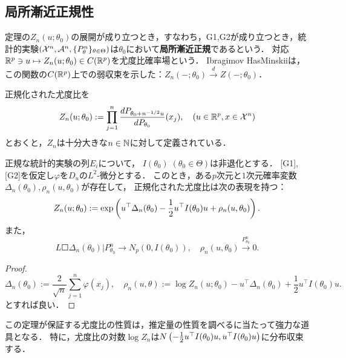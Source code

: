 \documentclass[uplatex,dvipdfmx]{jsreport}
\begin{document}
\subsection{局所漸近正規性}

\begin{tcolorbox}[colframe=ForestGreen, colback=ForestGreen!10!white,breakable,colbacktitle=ForestGreen!40!white,coltitle=black,fonttitle=\bfseries\sffamily,
title=]
    定理の$Z_n(u;\theta_0)$の展開が成り立つとき，すなわち，G1,G2が成り立つとき，統計的実験$(\mathcal{X}^n,\mathcal{A}^n,\{P^n_\theta\}_{\theta\in\Theta})$は$\theta_0$において\textbf{局所漸近正規}であるという．
    対応$\mathbb{R}^p\ni u\mapsto Z_n(u;\theta_0)\in C(\mathbb{R}^p)$を尤度比確率場という．
    Ibragimov HasMinskiiは，この関数の$C(\mathbb{R}^p)$上での弱収束を示した：$Z_n(-;\theta_0)\xrightarrow{d}Z(-;\theta_0)$．
\end{tcolorbox}

\begin{notation}
    正規化された尤度比を
    \[Z_n(u;\theta_0):=\prod^n_{j=1}\frac{dP_{\theta_0+n^{-1/2}u}}{dP_{\theta_0}}(x_j),\quad(u\in\mathbb{R}^p,x\in\mathcal{X}^n)\]
    とおくと，$Z_n$は十分大きな$n\in\mathbb{N}$に対して定義されている．
\end{notation}

\begin{theorem}[LeCam]
    正規な統計的実験の列$E_i$について，
    $I(\theta_0)\;(\theta_0\in\Theta)$は非退化とする．
    [G1],[G2]を仮定し$\varphi$を$D_u$の$L^2$-微分とする．
    このとき，ある$p$次元と$1$次元確率変数$\Delta_n(\theta_0),\rho_n(u,\theta_0)$が存在して，
    正規化された尤度比は次の表現を持つ：
    \[Z_n(u;\theta_0):=\exp\left(u^\top\Delta_n(\theta_0)-\frac{1}{2}u^\top I(\theta_0)u+\rho_n(u,\theta_0)\right).\]
    また，
    \[L\Square{\Delta_n(\theta_0)|P^n_{\theta_0}}\to N_p(0,I(\theta_0)),\quad\rho_n(u,\theta_0)\xrightarrow{P^n_{\theta_0}}0.\]
\end{theorem}
\begin{proof}
    \[\Delta_n(\theta_0):=\frac{2}{\sqrt{n}}\sum^n_{j=1}\varphi(x_j),\quad\rho_n(u,\theta):=\log Z_n(u;\theta_0)-u^\top\Delta_n(\theta_0)+\frac{1}{2}u^\top I(\theta_0)u.\]
    とすれば良い．
\end{proof}
\begin{remarks}
    この定理が保証する尤度比の性質は，推定量の性質を調べるに当たって強力な道具となる．
    特に，尤度比の対数$\log Z_n$は$N\left(-\frac{1}{2}u^\top I(\theta_0)u,u^\top I(\theta_0)u\right)$に分布収束する．
\end{remarks}
\end{document}
